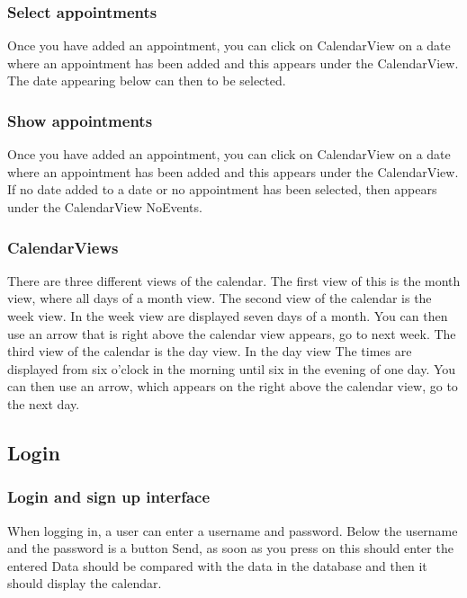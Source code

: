\documentclass[12pt]{scrartcl}
\begin{document}
    \subsubsection{Select appointments}
        Once you have added an appointment, you can click on CalendarView on a date where an appointment
        has been added and this appears under the CalendarView. The date appearing below can then
        to be selected.
    
    \subsubsection{Show appointments}
        Once you have added an appointment, you can click on CalendarView on a date where an appointment
        has been added and this appears under the CalendarView. If no date added to a date
        or no appointment has been selected, then appears under the CalendarView NoEvents.
            
    \subsubsection{CalendarViews}
        There are three different views of the calendar. The first view of this is the month view, where all days of
        a month view. The second view of the calendar is the week view. In the week view
        are displayed seven days of a month. You can then use an arrow that is right above the calendar view
        appears, go to next week. The third view of the calendar is the day view. In the day view
        The times are displayed from six o'clock in the morning until six in the evening of one day. You can then use an arrow,
        which appears on the right above the calendar view, go to the next day.
    
    \subsection{Login}
    \subsubsection{Login and sign up interface}      
        When logging in, a user can enter a username and password.
        Below the username and the password is a button Send, as soon as you press on this should enter the entered
        Data should be compared with the data in the database and then it should display the calendar.
\end{document}
